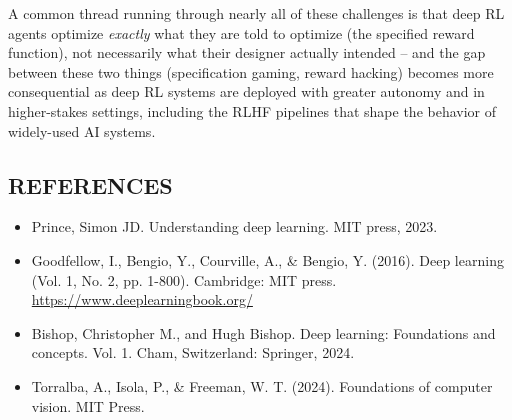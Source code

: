 \documentclass[12pt,a4paper]{article}
\begin{document}
\begin{keyidea}
A common thread running through nearly all of these challenges is that deep RL agents optimize \emph{exactly} what they are told to optimize (the specified reward function), not necessarily what their designer actually intended -- and the gap between these two things (specification gaming, reward hacking) becomes more consequential as deep RL systems are deployed with greater autonomy and in higher-stakes settings, including the RLHF pipelines that shape the behavior of widely-used AI systems.
\end{keyidea}

\subsection*{REFERENCES}
\begin{itemize}
    \item Prince, Simon JD. Understanding deep learning. MIT press, 2023.
    \item Goodfellow, I., Bengio, Y., Courville, A., \& Bengio, Y. (2016). Deep learning (Vol. 1, No. 2, pp. 1-800). Cambridge: MIT press. \url{https://www.deeplearningbook.org/}
    \item Bishop, Christopher M., and Hugh Bishop. Deep learning: Foundations and concepts. Vol. 1. Cham, Switzerland: Springer, 2024.
    \item Torralba, A., Isola, P., \& Freeman, W. T. (2024). Foundations of computer vision. MIT Press.
\end{itemize}
\end{document}
